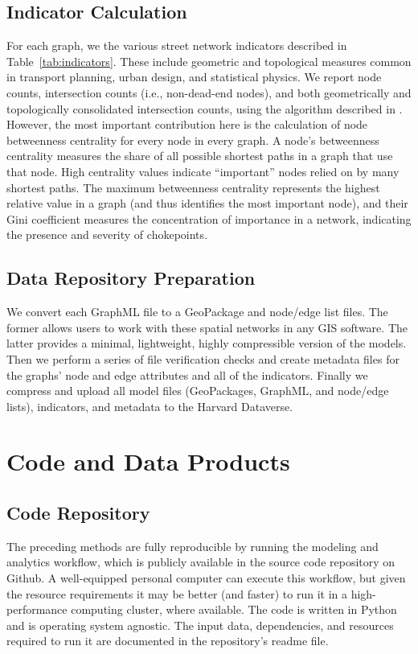 \documentclass[12pt,letterpaper]{article} %
\begin{document}
\subsection{Indicator Calculation}

For each graph, we the various street network indicators described in Table~\ref{tab:indicators}. These include geometric and topological measures common in transport planning, urban design, and statistical physics. We report node counts, intersection counts (i.e., non-dead-end nodes), and both geometrically and topologically consolidated intersection counts, using the algorithm described in \citet{boeing_topological_2025}. However, the most important contribution here is the calculation of node betweenness centrality for every node in every graph. A node's betweenness centrality measures the share of all possible shortest paths in a graph that use that node. High centrality values indicate \enquote{important} nodes relied on by many shortest paths. The maximum betweenness centrality represents the highest relative value in a graph (and thus identifies the most important node), and their Gini coefficient measures the concentration of importance in a network, indicating the presence and severity of chokepoints.

\subsection{Data Repository Preparation}

We convert each GraphML file to a GeoPackage and node/edge list files. The former allows users to work with these spatial networks in any GIS software. The latter provides a minimal, lightweight, highly compressible version of the models. Then we perform a series of file verification checks and create metadata files for the graphs' node and edge attributes and all of the indicators. Finally we compress and upload all model files (GeoPackages, GraphML, and node/edge lists), indicators, and metadata to the Harvard Dataverse.

\section{Code and Data Products}

\subsection{Code Repository}

The preceding methods are fully reproducible by running the modeling and analytics workflow, which is publicly available in the source code repository on Github. A well-equipped personal computer can execute this workflow, but given the resource requirements it may be better (and faster) to run it in a high-performance computing cluster, where available. The code is written in Python and is operating system agnostic. The input data, dependencies, and resources required to run it are documented in the repository's readme file.
\end{document}
